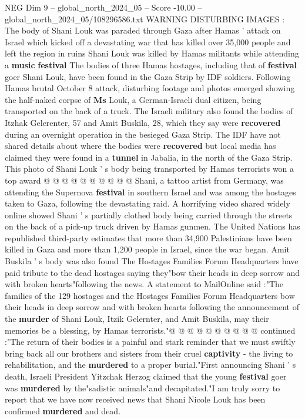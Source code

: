 \begin{textsample}{NEG Dim 9 – global\_north\_2024\_05 – Score -10.00 – global\_north\_2024\_05/108296586.txt}  \label{ex:f9_neg_232}
WARNING DISTURBING IMAGES : The body of Shani Louk was paraded through Gaza after Hamas ' attack on Israel which kicked off a devastating war that has killed over 35,000 people and left the region in ruins Shani Louk was killed by Hamas militants while attending a \textbf{music} \textbf{festival} The bodies of three Hamas hostages, including that of \textbf{festival} goer Shani Louk, have been found in the Gaza Strip by IDF soldiers.
Following Hamas brutal October 8 attack, disturbing footage and photos emerged showing the half-naked corpse of \textbf{Ms} Louk, a German-Israeli dual citizen, being transported on the back of a truck.
The Israeli military also found the bodies of Itzhak Gelerenter, 57 and Amit Buskila, 28, which they say were \textbf{recovered} during an overnight operation in the besieged Gaza Strip.
The IDF have not shared details about where the bodies were \textbf{recovered} but local media has claimed they were found in a \textbf{tunnel} in Jabalia, in the north of the Gaza Strip.
This photo of Shani Louk ' s body being transported by Hamas terrorists won a top award @ @ @ @ @ @ @ @ @ @ Shani, a tattoo artist from Germany, was attending the Supernova \textbf{festival} in southern Israel and was among the hostages taken to Gaza, following the devastating raid.
A horrifying video shared widely online showed Shani ' s partially clothed body being carried through the streets on the back of a pick-up truck driven by Hamas gunmen.
The United Nations has republished third-party estimates that more than 34,900 Palestinians have been killed in Gaza and more than 1,200 people in Israel, since the war began.
Amit Buskila ' s body was also found The Hostages Families Forum Headquarters have paid tribute to the dead hostages saying they"bow their heads in deep sorrow and with broken hearts"following the news.
A statement to MailOnline said :"The families of the 129 hostages and the Hostages Families Forum Headquarters bow their heads in deep sorrow and with broken hearts following the announcement of the \textbf{murder} of Shani Louk, Itzik Gelernter, and Amit Buskila, may their memories be a blessing, by Hamas terrorists."@ @ @ @ @ @ @ @ @ @ continued :"The return of their bodies is a painful and stark reminder that we must swiftly bring back all our brothers and sisters from their cruel \textbf{captivity} - the living to rehabilitation, and the \textbf{murdered} to a proper burial."First announcing Shani ' s death, Israeli President Yitzchak Herzog claimed that the young \textbf{festival} goer was \textbf{murdered} by the"sadistic animals"and decapitated."I am truly sorry to report that we have now received news that Shani Nicole Louk has been confirmed \textbf{murdered} and dead.

\end{textsample}
